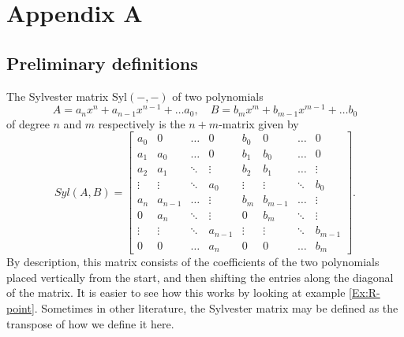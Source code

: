 \chapter{Appendix A}

\section{Preliminary definitions}

\begin{definition}\label{Def:Sylvester matrix}
The Sylvester matrix \(\text{Syl}(-,-)\) of two polynomials 
\begin{equation*}
A = a_n x^n + a_{n-1}x^{n-1} + \dots a_0, \quad
B = b_m x^m + b_{m-1}x^{m-1} + \dots b_0
\end{equation*}
of degree \(n\) and \(m\) respectively is the \(n+m\)-matrix given by
\begin{equation*}
{Syl}(A,B) = 
\begin{bmatrix}
     a_0 &0 &\dots &0 &b_0 &0 &\dots &0 \\
     a_1 &a_0 &\dots &0 &b_1 &b_0 &\dots &0 \\
     a_2 &a_1 &\ddots &\vdots &b_2 &b_1 &\dots &\vdots \\
     \vdots &\vdots &\ddots &a_0 &\vdots &\vdots &\ddots &b_0\\
     a_n & a_{n-1} &\dots &\vdots &b_m & b_{m-1} &\dots &\vdots \\
     0 & a_n &\ddots &\vdots &0 & b_m &\ddots &\vdots\\
     \vdots &\vdots &\ddots &a_{n-1} &\vdots &\vdots &\ddots &b_{m-1}\\
     0 &0 &\dots &a_n &0 &0 &\dots &b_m
\end{bmatrix}.
\end{equation*}
%
By description, this matrix consists of the coefficients of the two polynomials placed vertically from the start, and then shifting the entries along the diagonal of the matrix. It is easier to see how this works by looking at example \ref{Ex:R-point}. Sometimes in other literature, the Sylvester matrix may be defined as the transpose of how we define it here. 
%
\end{definition}
%
